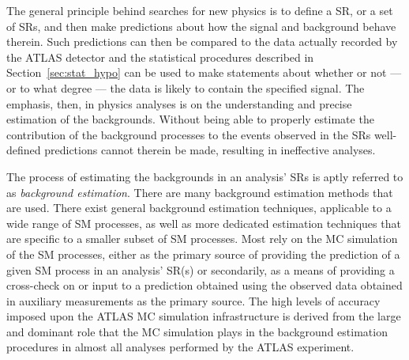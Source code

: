 The general principle behind searches for new physics is to define a SR, or a set of SRs,
and then make predictions about how the signal and background behave therein.
Such predictions can then be compared to the data actually recorded by the ATLAS detector
and the statistical procedures described in Section~\ref{sec:stat_hypo} can be used to
make statements about whether or not --- or to what degree --- the data is likely to contain the specified signal.
The emphasis, then, in physics analyses is on the understanding and precise estimation of the backgrounds.
Without being able to properly estimate the contribution of the background processes to the
events observed in the SRs well-defined predictions cannot therein be made, resulting in ineffective
analyses.

The process of estimating the backgrounds in an analysis' SRs is aptly referred to as
\textit{background estimation}.
There are many background estimation methods that are used.
There exist general background estimation techniques, applicable to a wide range of SM processes,
as well as more dedicated estimation techniques that are specific to a smaller subset of
SM processes.
Most rely on the MC simulation of the SM processes, either as the primary source of providing
the prediction of a given SM process in an analysis' SR(s) or secondarily, as a means of providing a
cross-check on or input to a prediction obtained using the observed data obtained in auxiliary measurements as the primary source.
The high levels of accuracy imposed upon the ATLAS MC simulation infrastructure is derived
from the large and dominant role that the MC simulation plays in the background estimation
procedures in almost all analyses performed by the ATLAS experiment.

